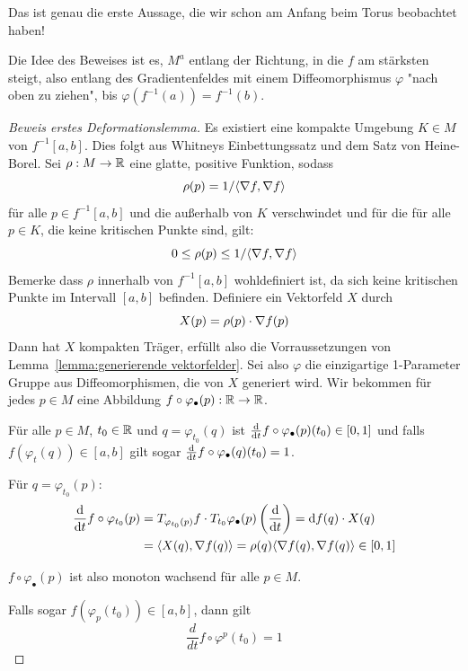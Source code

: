 Das ist genau die erste Aussage, die wir schon am Anfang beim Torus beobachtet 
haben!

Die Idee des Beweises ist es, $M^a$ entlang der Richtung, in die $f$ am stärksten
steigt, also entlang des Gradientenfeldes mit einem Diffeomorphismus $\varphi$ 
"nach oben zu ziehen", bis $\varphi(f^{-1}(a)) = f^{-1}(b)$.

\begin{proof}[Beweis erstes Deformationslemma]
    Es existiert eine kompakte Umgebung $K \in M$ von $f^{-1}[a, b]$. Dies folgt
    aus Whitneys Einbettungssatz und dem Satz von Heine-Borel.
    Sei $\rho: M \to { \mathbb R }$ eine glatte, positive Funktion, sodass
    \[ \rho(p) = 1 / \langle { \nabla } f, { \nabla } f \rangle \]
    für alle $p \in f^{-1}[a, b]$ und die außerhalb von $K$ verschwindet und für
    die für alle $p \in K$, die keine kritischen Punkte sind, gilt: 
    \[ 0 \leq \rho(p) \leq 1 / \langle { \nabla } f, { \nabla } f \rangle \]
    Bemerke dass $\rho$ innerhalb von $f^{-1}[a, b]$ wohldefiniert 
    ist, da sich keine kritischen Punkte im Intervall $[a, b]$ befinden. 
    Definiere ein Vektorfeld $X$ durch
    \[ X(p) = \rho(p) \cdot { \nabla } f (p) \]
    Dann hat $X$ kompakten Träger, erfüllt also die Vorraussetzungen von 
    Lemma~\ref{lemma:generierende vektorfelder}. Sei also $\varphi$ die
    einzigartige 1-Parameter Gruppe aus Diffeomorphismen, die von $X$ generiert
    wird. 
    Wir bekommen für jedes $p \in M$ eine Abbildung 
    $f \circ \varphi_{\bullet}(p): { \mathbb R } \to { \mathbb R }$.
    
     Für alle $p \in M$, $t_0 \in { \mathbb R }$ und $q = \varphi_{t_0}(q)$
    ist ${ \frac{{ \operatorname{d} } }{{ \operatorname{d} } t} } f \circ \varphi_{\bullet}(p) (t_0) \in [0, 1]$ und falls $f(\varphi_t(q)) \in [a, b]$
    gilt sogar ${ \frac{{ \operatorname{d} } }{{ \operatorname{d} } t} } f \circ \varphi_{\bullet}(q) (t_0) = 1$.

    Für $q = \varphi_{t_0}(p)$:
    \begin{align*}
        { \frac{{ \operatorname{d} }}{{ \operatorname{d} }t} } f \circ \varphi_{t_0}(p)
        & = T_{\varphi_{t_0}(p)} f \cdot T_{t_0}\varphi_{\bullet}(p) \left( { \frac{{ \operatorname{d} } }{{ \operatorname{d} } t} } \right)
        = { \operatorname{d} } f (q) \cdot X(q) \\
        & = \langle X(q), { \nabla } f (q) \rangle 
        = \rho(q) \langle { \nabla } f (q), { \nabla } f (q) \rangle \in [0, 1]
    \end{align*}
    
    $f \circ \varphi_{\bullet}(p)$ ist also monoton wachsend für alle $p \in M$.

    Falls sogar $f(\varphi_p(t_0)) \in [a, b]$, dann gilt
    \[ \frac{d}{dt} f \circ \varphi^p (t_0) = 1 \]
    \sectiondone


\end{proof}
